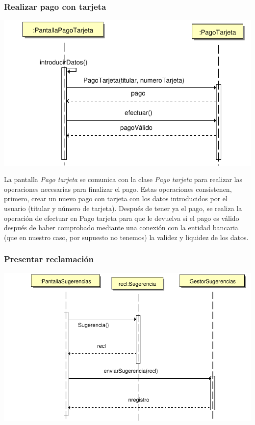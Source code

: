 \documentclass[11pt, a4paper, twoside, titlepage]{article}
\begin{document}
			\subsubsection{Realizar pago con tarjeta}
				\begin{center}
					\includegraphics[scale=.8]{diseno/diagramas/pagotarjeta.pdf}
				\end{center}
				La pantalla {\itshape Pago tarjeta} se comunica con la clase {\itshape Pago tarjeta} para realizar las operaciones necesarias para finalizar el pago. Estas operaciones consistenen, primero, crear un nuevo pago con tarjeta con los datos introducidos por el usuario (titular y número de tarjeta). Después de tener ya el pago, se realiza la operación de efectuar en Pago tarjeta para que le devuelva si el pago es válido después de haber comprobado mediante una conexión con la entidad bancaria (que en nuestro caso, por supuesto no tenemos) la validez y liquidez de los datos.

			\subsubsection{Presentar reclamación}
				\begin{center}
					\includegraphics[scale=.7]{diseno/diagramas/presentarreclamacion.pdf}
				\end{center}
\end{document}

